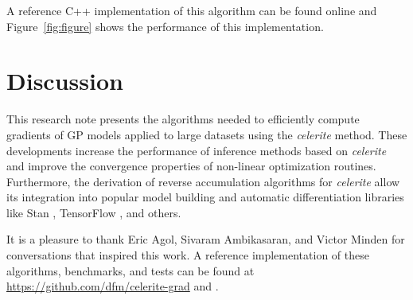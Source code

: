 \documentclass[rnaas]{aastex62}
\newcommand{\figureref}[1]{\ref{fig:#1}}
\newcommand{\Figure}[1]{Figure~\figureref{#1}}
\begin{document}
\noindent A reference C++ implementation of this algorithm can be found online
\citep{Foreman-Mackey:2018} and \Figure{figure} shows the performance of this
implementation.

\section{Discussion}

This research note presents the algorithms needed to efficiently compute
gradients of GP models applied to large datasets using the \emph{celerite}
method.
These developments increase the performance of inference methods based on
\emph{celerite} and improve the convergence properties of non-linear
optimization routines.
Furthermore, the derivation of reverse accumulation algorithms for
\emph{celerite} allow its integration into popular model building and
automatic differentiation libraries like Stan \citep{Carpenter:2015},
TensorFlow \citep{Abadi:2016}, and others.

\acknowledgments
It is a pleasure to thank
Eric Agol,
Sivaram Ambikasaran, and
Victor Minden
for conversations that inspired this work.
A reference implementation of these algorithms, benchmarks, and tests can be
found at \url{https://github.com/dfm/celerite-grad} and
\citet{Foreman-Mackey:2018}.
\end{document}

